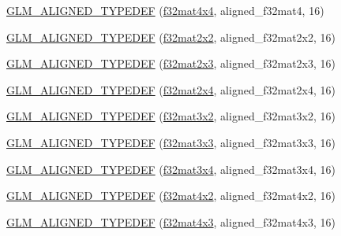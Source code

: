 \begin{DoxyCompactItemize}
\item 
\hyperlink{group__gtx__type__aligned_gaf18dbff14bf13d3ff540c517659ec045}{G\+L\+M\+\_\+\+A\+L\+I\+G\+N\+E\+D\+\_\+\+T\+Y\+P\+E\+D\+E\+F} (\hyperlink{group__gtc__type__precision_gac4a4b2671cbf50ab95c55fce2bfcd811}{f32mat4x4}, aligned\+\_\+f32mat4, 16)
\item 
\hyperlink{group__gtx__type__aligned_ga66339f6139bf7ff19e245beb33f61cc8}{G\+L\+M\+\_\+\+A\+L\+I\+G\+N\+E\+D\+\_\+\+T\+Y\+P\+E\+D\+E\+F} (\hyperlink{group__gtc__type__precision_gae7ebbb68656a5fd879d536b5d8452fb1}{f32mat2x2}, aligned\+\_\+f32mat2x2, 16)
\item 
\hyperlink{group__gtx__type__aligned_ga1558a48b3934011b52612809f443e46d}{G\+L\+M\+\_\+\+A\+L\+I\+G\+N\+E\+D\+\_\+\+T\+Y\+P\+E\+D\+E\+F} (\hyperlink{group__gtc__type__precision_gac4573d3d213b2bce23943caef565a211}{f32mat2x3}, aligned\+\_\+f32mat2x3, 16)
\item 
\hyperlink{group__gtx__type__aligned_gaa52e5732daa62851627021ad551c7680}{G\+L\+M\+\_\+\+A\+L\+I\+G\+N\+E\+D\+\_\+\+T\+Y\+P\+E\+D\+E\+F} (\hyperlink{group__gtc__type__precision_gab0eab14575c18077fd3415539bce685a}{f32mat2x4}, aligned\+\_\+f32mat2x4, 16)
\item 
\hyperlink{group__gtx__type__aligned_gac09663c42566bcb58d23c6781ac4e85a}{G\+L\+M\+\_\+\+A\+L\+I\+G\+N\+E\+D\+\_\+\+T\+Y\+P\+E\+D\+E\+F} (\hyperlink{group__gtc__type__precision_ga61653615c76194cdf3454e6e703525e0}{f32mat3x2}, aligned\+\_\+f32mat3x2, 16)
\item 
\hyperlink{group__gtx__type__aligned_ga3f510999e59e1b309113e1d561162b29}{G\+L\+M\+\_\+\+A\+L\+I\+G\+N\+E\+D\+\_\+\+T\+Y\+P\+E\+D\+E\+F} (\hyperlink{group__gtc__type__precision_ga715b36ea1e2d1ffaaef7517cc78b3877}{f32mat3x3}, aligned\+\_\+f32mat3x3, 16)
\item 
\hyperlink{group__gtx__type__aligned_ga2c9c94f0c89cd71ce56551db6cf4aaec}{G\+L\+M\+\_\+\+A\+L\+I\+G\+N\+E\+D\+\_\+\+T\+Y\+P\+E\+D\+E\+F} (\hyperlink{group__gtc__type__precision_ga9995b357aa1e9603adad780cfde1aa07}{f32mat3x4}, aligned\+\_\+f32mat3x4, 16)
\item 
\hyperlink{group__gtx__type__aligned_ga99ce8274c750fbfdf0e70c95946a2875}{G\+L\+M\+\_\+\+A\+L\+I\+G\+N\+E\+D\+\_\+\+T\+Y\+P\+E\+D\+E\+F} (\hyperlink{group__gtc__type__precision_gab531a3d0479121732ae090254e0bd58f}{f32mat4x2}, aligned\+\_\+f32mat4x2, 16)
\item 
\hyperlink{group__gtx__type__aligned_ga9476ef66790239df53dbe66f3989c3b5}{G\+L\+M\+\_\+\+A\+L\+I\+G\+N\+E\+D\+\_\+\+T\+Y\+P\+E\+D\+E\+F} (\hyperlink{group__gtc__type__precision_gad68d998fa74028e02bfadd4778bd549a}{f32mat4x3}, aligned\+\_\+f32mat4x3, 16)

\end{DoxyCompactItemize}

